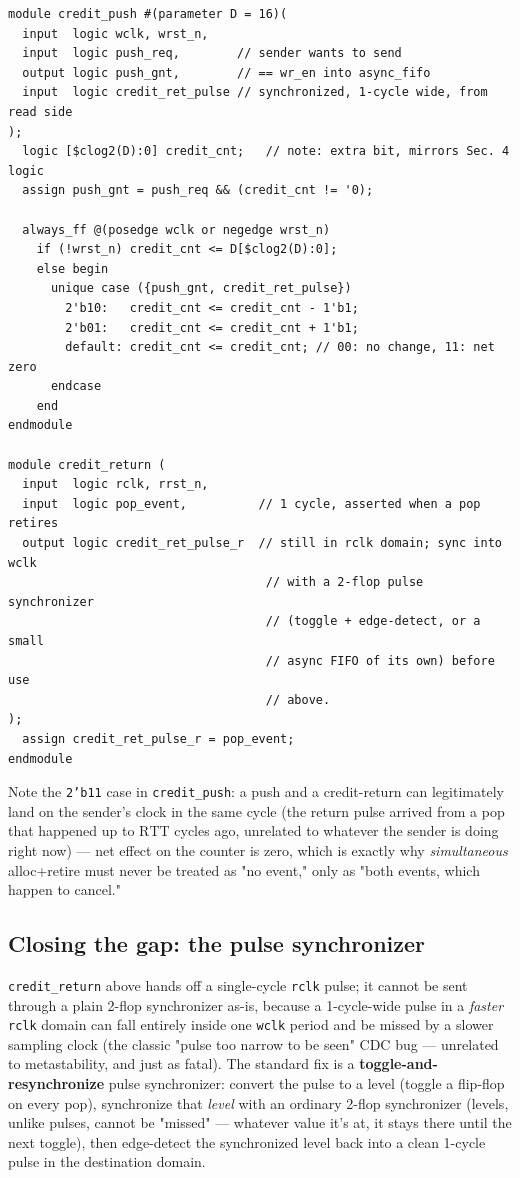 \documentclass[12pt]{article}
\begin{document}
\begin{lstlisting}[style=sv,caption={Write-side credit counter + read-side credit-return pulse (layered on top of the core above)}]
module credit_push #(parameter D = 16)(
  input  logic wclk, wrst_n,
  input  logic push_req,        // sender wants to send
  output logic push_gnt,        // == wr_en into async_fifo
  input  logic credit_ret_pulse // synchronized, 1-cycle wide, from read side
);
  logic [$clog2(D):0] credit_cnt;   // note: extra bit, mirrors Sec. 4 logic
  assign push_gnt = push_req && (credit_cnt != '0);

  always_ff @(posedge wclk or negedge wrst_n)
    if (!wrst_n) credit_cnt <= D[$clog2(D):0];
    else begin
      unique case ({push_gnt, credit_ret_pulse})
        2'b10:   credit_cnt <= credit_cnt - 1'b1;
        2'b01:   credit_cnt <= credit_cnt + 1'b1;
        default: credit_cnt <= credit_cnt; // 00: no change, 11: net zero
      endcase
    end
endmodule

module credit_return (
  input  logic rclk, rrst_n,
  input  logic pop_event,          // 1 cycle, asserted when a pop retires
  output logic credit_ret_pulse_r  // still in rclk domain; sync into wclk
                                    // with a 2-flop pulse synchronizer
                                    // (toggle + edge-detect, or a small
                                    // async FIFO of its own) before use
                                    // above.
);
  assign credit_ret_pulse_r = pop_event;
endmodule
\end{lstlisting}

\noindent Note the \texttt{2'b11} case in \texttt{credit\_push}: a push and
a credit-return can legitimately land on the sender's clock in the same
cycle (the return pulse arrived from a pop that happened up to
$\text{RTT}$ cycles ago, unrelated to whatever the sender is doing right
now) — net effect on the counter is zero, which is exactly why
\emph{simultaneous} alloc+retire must never be treated as "no event," only
as "both events, which happen to cancel."

\subsection{Closing the gap: the pulse synchronizer}
\label{sec:pulsesync}

\texttt{credit\_return} above hands off a single-cycle \texttt{rclk} pulse;
it cannot be sent through a plain 2-flop synchronizer as-is, because a
1-cycle-wide pulse in a \emph{faster} \texttt{rclk} domain can fall entirely
inside one \texttt{wclk} period and be missed by a slower sampling clock
(the classic "pulse too narrow to be seen" CDC bug — unrelated to
metastability, and just as fatal). The standard fix is a
\textbf{toggle-and-resynchronize} pulse synchronizer: convert the pulse to
a level (toggle a flip-flop on every pop), synchronize that \emph{level}
with an ordinary 2-flop synchronizer (levels, unlike pulses, cannot be
"missed" — whatever value it's at, it stays there until the next toggle),
then edge-detect the synchronized level back into a clean 1-cycle pulse in
the destination domain.
\end{document}
